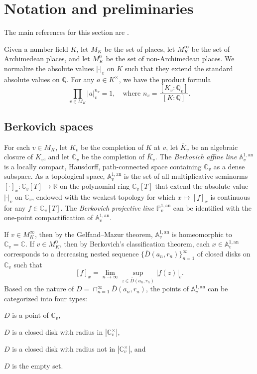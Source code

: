 \documentclass[10pt,a4paper]{amsart}
\numberwithin{equation}{section}
\theoremstyle{plain}
\theoremstyle{definition}
\theoremstyle{remark}
\newcommand{\A}{\mathbb A}
\newcommand{\C}{\mathbb C}
\newcommand{\PP}{\mathbb P}
\newcommand{\Q}{\mathbb Q}
\newcommand{\R}{\mathbb R}
\newcommand{\an}{\mathrm{an}}
\renewcommand{\bar}{\overline}
\begin{document}
\section{Notation and preliminaries}\label{sec2}

The main references for this section are \cite{BR2,BD1,FRL,Fi}.

Given a number field $K$, let $M_{K}$ be the set of places, let
$M_{K}^{\infty}$ be the set of Archimedean places, and let $M_{K}^{0}$
be the set of non-Archimedean places. We normalize the absolute values
$|\cdot|_{v}$ on $K$ such that they extend the standard absolute
values on $\Q$. For any $a\in K^{\times}$, we have the product
formula
\[
\prod_{v\in M_{K}}|a|_{v}^{n_{v}}=1,\quad\text{where }n_{v}=\frac{[K_{v}:\Q_{v}]}{[K:\Q]}.
\]


\subsection{Berkovich spaces}\label{sec2.1}

For each $v\in M_{K}$, let $K_{v}$ be the completion of $K$ at $v$,
let $\bar{K}_{v}$ be an algebraic closure of $K_{v}$, and let $\C_{v}$
be the completion of $\bar{K}_{v}$. The \textit{Berkovich affine line}
$\A_{v}^{1,\an}$ is a locally compact, Hausdorff, path-connected space
containing $\C_{v}$ as a dense subspace. As a topological space,
$\A_{v}^{1,\an}$ is the set of all multiplicative seminorms
$[\cdot]_{x}\colon\C_{v}[T]\to\R$ on the polynomial ring $\C_{v}[T]$
that extend the absolute value $|\cdot|_{v}$ on $\C_{v}$, endowed with
the weakest topology for which $x\mapsto[f]_{x}$ is continuous for any
$f\in\C_{v}[T]$.  The \textit{Berkovich projective line}
$\PP_{v}^{1,\an}$ can be identified with the one-point
compactification of $\A_{v}^{1,\an}$.

If $v\in M_{K}^{\infty}$, then by the Gelfand--Mazur theorem,
$\A_{v}^{1,\an}$ is homeomorphic to $\C_{v}=\C$.
If $v\in M_{K}^{0}$, then by Berkovich\textquoteright s classification
theorem, each $x\in\A_{v}^{1,\an}$ corresponds to a
decreasing nested sequence $\{\overline{D}(a_{n},r_{n})\}_{n=1}^{\infty}$
of closed disks on $\C_{v}$ such that
\[
[f]_{x}=\lim_{n\to\infty}\sup_{z\in\overline{D}(a_{n},r_{n})}|f(z)|_{v}.
\]
Based on the nature of $D=\cap_{n=1}^{\infty}\overline{D}(a_{n},r_{n})$,
the points of $\A_{v}^{1,\an}$ can be categorized into
four types: \begin{enumerate*}[label=(\Roman*)]\item $D$ is a point of $\C_{v}$, \item $D$ is
a closed disk with radius in $|\C_{v}^{\times}|$, \item $D$
is a closed disk with radius not in $|\C_{v}^{\times}|$,
and \item $D$ is the empty set.\end{enumerate*}
\end{document}
